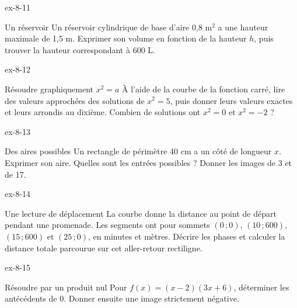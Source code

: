 \clearpage{}
\begin{blocLivre}{ex-8-11}\begin{exercice}[3]{Un réservoir}
Un réservoir cylindrique de base d’aire 0,8 m$^2$ a une hauteur maximale de 1,5 m. Exprimer son volume en fonction de la hauteur $h$, puis trouver la hauteur correspondant à 600 L.
\label{fig-ex-8-11}
\end{exercice}\end{blocLivre}
\begin{blocLivre}{ex-8-12}\begin{exercice}[3]{Résoudre graphiquement $x^2=a$}
À l’aide de la courbe de la fonction carré, lire des valeurs approchées des solutions de $x^2=5$, puis donner leurs valeurs exactes et leurs arrondis au dixième. Combien de solutions ont $x^2=0$ et $x^2=-2$ ?
\label{fig-ex-8-12}
\end{exercice}\end{blocLivre}
\begin{blocLivre}{ex-8-13}\begin{exercice}[3]{Des aires possibles}
Un rectangle de périmètre 40 cm a un côté de longueur $x$. Exprimer son aire. Quelles sont les entrées possibles ? Donner les images de 3 et de 17.
\label{fig-ex-8-13}
\end{exercice}\end{blocLivre}
\begin{blocLivre}{ex-8-14}\begin{exercice}[3]{Une lecture de déplacement}
La courbe donne la distance au point de départ pendant une promenade. Les segments ont pour sommets $(0\,;0)$, $(10\,;600)$, $(15\,;600)$ et $(25\,;0)$, en minutes et mètres. Décrire les phases et calculer la distance totale parcourue sur cet aller-retour rectiligne.
\label{fig-ex-8-14}
\end{exercice}\end{blocLivre}
\begin{blocLivre}{ex-8-15}\begin{exercice}[3]{Résoudre par un produit nul}
Pour $f(x)=(x-2)(3x+6)$, déterminer les antécédents de 0. Donner ensuite une image strictement négative.
\end{exercice}\end{blocLivre}

\clearpage
